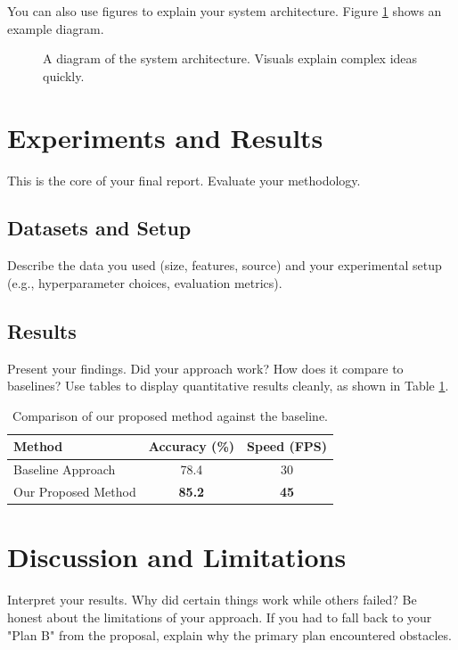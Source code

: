 \documentclass[11pt]{article}
\begin{document}
You can also use figures to explain your system architecture. Figure \ref{fig:architecture} shows an example diagram.

\begin{figure}[h]
    \centering
    \caption{A diagram of the system architecture. Visuals explain complex ideas quickly.}
    \label{fig:architecture}
\end{figure}

\section{Experiments and Results}
This is the core of your final report. Evaluate your methodology. 

\subsection{Datasets and Setup}
Describe the data you used (size, features, source) and your experimental setup (e.g., hyperparameter choices, evaluation metrics).

\subsection{Results}
Present your findings. Did your approach work? How does it compare to baselines? Use tables to display quantitative results cleanly, as shown in Table \ref{tab:results}.

\begin{table}[h]
    \centering
    \begin{tabular}{lcc}
        \toprule
        \textbf{Method} & \textbf{Accuracy (\%)} & \textbf{Speed (FPS)} \\
        \midrule
        Baseline Approach & 78.4 & 30 \\
        Our Proposed Method & \textbf{85.2} & \textbf{45} \\
        \bottomrule
    \end{tabular}
    \caption{Comparison of our proposed method against the baseline.}
    \label{tab:results}
\end{table}

\section{Discussion and Limitations}
Interpret your results. Why did certain things work while others failed? Be honest about the limitations of your approach. If you had to fall back to your "Plan B" from the proposal, explain why the primary plan encountered obstacles.
\end{document}
